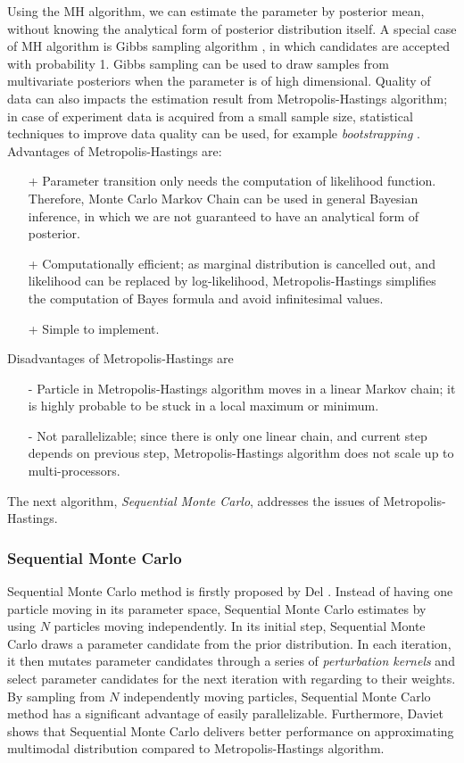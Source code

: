 Using the MH algorithm, we can estimate the parameter by posterior mean, without knowing the
analytical form of posterior distribution itself. A special case of MH algorithm is Gibbs sampling
algorithm \cite{geman1984stochastic}, in which candidates are accepted with probability 1. Gibbs
sampling can be used to draw samples from multivariate posteriors when the parameter is of high
dimensional. Quality of data can also impacts the estimation result from Metropolis-Hastings
algorithm; in case of experiment data is acquired from a small sample size, statistical techniques
to improve data quality can be used, for example \textit{bootstrapping} \cite{efron1992bootstrap}.\\
Advantages of Metropolis-Hastings are:
\begin{itemize}
    \item[+] Parameter transition only needs the computation of likelihood function.
          Therefore, Monte Carlo Markov Chain can be used in general Bayesian inference,
          in which we are not guaranteed to have an analytical form of posterior.
    \item[+] Computationally efficient; as marginal distribution is cancelled out, and likelihood can
          be replaced by log-likelihood, Metropolis-Hastings simplifies the computation of Bayes formula
          and avoid infinitesimal values.
    \item[+] Simple to implement.
\end{itemize}
Disadvantages of Metropolis-Hastings are
\begin{enumerate}
    \item[-] Particle in Metropolis-Hastings algorithm moves in a linear Markov chain; it is highly
          probable to be stuck in a local maximum or minimum.
    \item[-] Not parallelizable; since there is only one linear chain, and current step depends on
          previous step, Metropolis-Hastings algorithm does not scale up to multi-processors.
\end{enumerate}
The next algorithm, \textit{Sequential Monte Carlo}, addresses the issues of Metropolis-Hastings.

\subsubsection{Sequential Monte Carlo}
Sequential Monte Carlo method is firstly proposed by Del \cite{del2006sequential}. Instead of having
one particle moving in its parameter space, Sequential Monte Carlo estimates by using $N$ particles
moving independently. In its initial step, Sequential Monte Carlo draws a parameter candidate from
the prior distribution. In each iteration, it then mutates parameter candidates through a series of
\textit{perturbation kernels} and select parameter candidates for the next iteration with regarding
to their weights. By sampling from $N$ independently moving particles, Sequential Monte Carlo method
has a significant advantage of easily parallelizable. Furthermore, Daviet \cite{daviet2018inference}
shows that Sequential Monte Carlo delivers better performance on approximating multimodal
distribution compared to Metropolis-Hastings algorithm.

